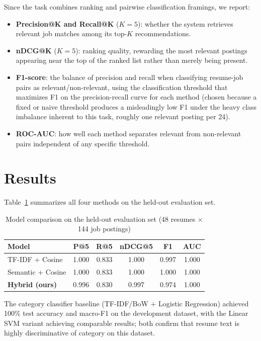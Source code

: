 \documentclass[conference]{IEEEtran}
\begin{document}
Since the task combines ranking and pairwise classification framings, we report:
\begin{itemize}
\item \textbf{Precision@K and Recall@K} ($K=5$): whether the system retrieves relevant job matches among its top-$K$ recommendations.
\item \textbf{nDCG@K} ($K=5$): ranking quality, rewarding the most relevant postings appearing near the top of the ranked list rather than merely being present.
\item \textbf{F1-score}: the balance of precision and recall when classifying resume-job pairs as relevant/non-relevant, using the classification threshold that maximizes F1 on the precision-recall curve for each method (chosen because a fixed or naive threshold produces a misleadingly low F1 under the heavy class imbalance inherent to this task, roughly one relevant posting per 24).
\item \textbf{ROC-AUC}: how well each method separates relevant from non-relevant pairs independent of any specific threshold.
\end{itemize}

\section{Results}

Table~\ref{tab:results} summarizes all four methods on the held-out evaluation set.

\begin{table}[htbp]
\caption{Model comparison on the held-out evaluation set (48 resumes $\times$ 144 job postings)}
\begin{center}
\begin{tabular}{lccccc}
\toprule
\textbf{Model} & \textbf{P@5} & \textbf{R@5} & \textbf{nDCG@5} & \textbf{F1} & \textbf{AUC} \\
\midrule
TF-IDF + Cosine        & 1.000 & 0.833 & 1.000 & 0.997 & 1.000 \\
Semantic + Cosine      & 1.000 & 0.833 & 1.000 & 1.000 & 1.000 \\
\textbf{Hybrid (ours)} & 0.996 & 0.830 & 0.997 & 0.974 & 1.000 \\
\bottomrule
\end{tabular}
\label{tab:results}
\end{center}
\end{table}

The category classifier baseline (TF-IDF/BoW + Logistic Regression) achieved 100\% test accuracy and macro-F1 on the development dataset, with the Linear SVM variant achieving comparable results; both confirm that resume text is highly discriminative of category on this dataset.
\end{document}
